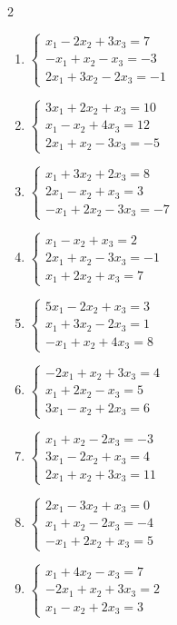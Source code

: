 \begin{multicols}{2}
\begin{enumerate}[label=\arabic*., leftmargin=*]
\item $\begin{cases}x_1-2x_2+3x_3=7\\-x_1+x_2-x_3=-3\\2x_1+3x_2-2x_3=-1\end{cases}$

\item $\begin{cases}3x_1+2x_2+x_3=10\\x_1-x_2+4x_3=12\\2x_1+x_2-3x_3=-5\end{cases}$

\item $\begin{cases}x_1+3x_2+2x_3=8\\2x_1-x_2+x_3=3\\-x_1+2x_2-3x_3=-7\end{cases}$

\item $\begin{cases}x_1-x_2+x_3=2\\2x_1+x_2-3x_3=-1\\x_1+2x_2+x_3=7\end{cases}$

\item $\begin{cases}5x_1-2x_2+x_3=3\\x_1+3x_2-2x_3=1\\-x_1+x_2+4x_3=8\end{cases}$

\item $\begin{cases}-2x_1+x_2+3x_3=4\\x_1+2x_2-x_3=5\\3x_1-x_2+2x_3=6\end{cases}$

\item $\begin{cases}x_1+x_2-2x_3=-3\\3x_1-2x_2+x_3=4\\2x_1+x_2+3x_3=11\end{cases}$

\item $\begin{cases}2x_1-3x_2+x_3=0\\x_1+x_2-2x_3=-4\\-x_1+2x_2+x_3=5\end{cases}$

\item $\begin{cases}x_1+4x_2-x_3=7\\-2x_1+x_2+3x_3=2\\x_1-x_2+2x_3=3\end{cases}$


\end{enumerate}
\end{multicols}
